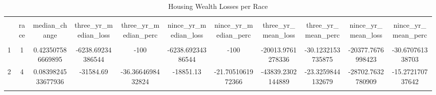 
\begin{table}[!htbp] \centering 
  \caption{Housing Wealth Losses per Race} 
  \label{} 
\begin{tabular}{@{\extracolsep{5pt}} ccccccccccc} 
\\[-1.8ex]\hline 
\hline \\[-1.8ex] 
 & race & median\_change & three\_yr\_median\_loss & three\_yr\_median\_perc & nince\_yr\_median\_loss & nince\_yr\_median\_perc & three\_yr\_mean\_loss & three\_yr\_mean\_perc & nince\_yr\_mean\_loss & nince\_yr\_mean\_perc \\ 
\hline \\[-1.8ex] 
1 & 1 & 0.423507586669895 & -6238.69234386544 & -100 & -6238.69234386544 & -100 & -20013.9761278336 & -30.1232153735875 & -20377.7676998423 & -30.670761338703 \\ 
2 & 4 & 0.0839824533677936 & -31584.69 & -36.3664698432824 & -18851.13 & -21.7051061972366 & -43839.2302144889 & -23.3259844132679 & -28702.7632780909 & -15.272170737642 \\ 
\hline \\[-1.8ex] 
\end{tabular} 
\end{table} 

